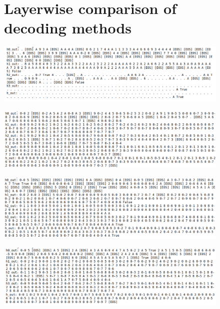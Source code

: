\documentclass[10pt,a4paper]{article}
\begin{document}
\appendix
\begin{figure}[p]
    \centering
    \section{Layerwise comparison of decoding methods}
    \vspace{-0.5em}  %
    
    \includegraphics[width=\textwidth,height=0.19\textheight,keepaspectratio]{greedy_decoding.png}
    \label{fig:greedy}
    
    \vspace{0.5em}
    
    \includegraphics[width=\textwidth,height=0.19\textheight,keepaspectratio]{rank2_decoding.png}
    \label{fig:rank2}
    
    \vspace{0.5em}
    
    \includegraphics[width=\textwidth,height=0.19\textheight,keepaspectratio]{our_method_decoding.png}
    \label{fig:our-method}
    
    \vspace{0.5em}
    
    \includegraphics[width=\textwidth,height=0.19\textheight,keepaspectratio]{random_tokens_decoding.png}
    \label{fig:random}
\end{figure}
\end{document}
